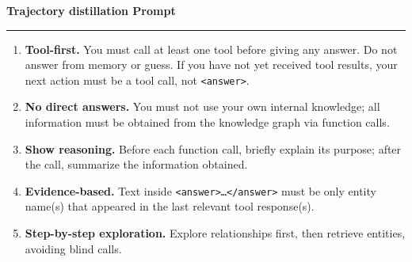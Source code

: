 \begin{table}[t!]
\centering
\caption{\textbf{Prompt for trajectory distillation.}}
\label{tab:traj_gen_prompt}
 
\begin{minipage}{\textwidth}
\begin{mdframed}[style=outerframe]
 
\begin{center}
  {\small\textbf{Trajectory distillation Prompt}}
\end{center}
\noindent\rule{\linewidth}{0.4pt}
\begin{mdframed}[style=subframe]
 
 
\vspace{6pt}
\begin{enumerate}[leftmargin=2em, itemsep=1pt, topsep=2pt, label=\arabic*.]
  \small
  \item \textbf{Tool-first.} You must call at least one tool before giving any answer. Do not answer from memory or guess. If you have not yet received tool results, your next action must be a tool call, not \texttt{<answer>}.
  \item \textbf{No direct answers.} You must not use your own internal knowledge; all information must be obtained from the knowledge graph via function calls.
  \item \textbf{Show reasoning.} Before each function call, briefly explain its purpose; after the call, summarize the information obtained.
  \item \textbf{Evidence-based.} Text inside \texttt{<answer>{\ldots}</answer>} must be only entity name(s) that appeared in the last relevant tool response(s).
  \item \textbf{Step-by-step exploration.} Explore relationships first, then retrieve entities, avoiding blind calls.
\end{enumerate}
 
\vspace{6pt}
 
\vspace{6pt}
 

\end{mdframed}
\end{mdframed}
\end{minipage}
\end{table}
